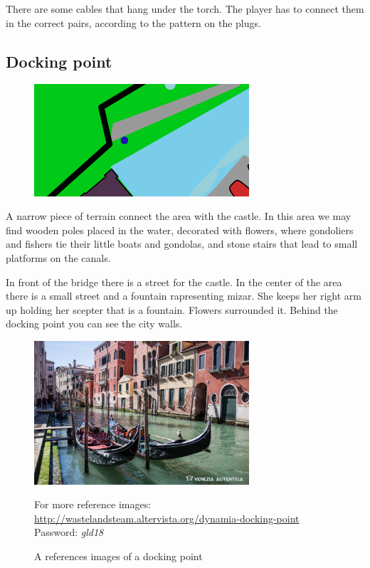 There are some cables that hang under the torch. The player has to connect them in the correct pairs, according to the pattern on the plugs.

\subsection{Docking point}
\begin{figure}[H]
    \centering
    \includegraphics[width=8cm]{Images/Maps/dockingPoint}
  \end{figure}
A narrow piece of terrain connect the area with the castle. 
In this area we may find wooden poles placed in the water, decorated with flowers, where gondoliers and fishers tie their little boats and gondolas, and  stone stairs that lead to small platforms on the canals.
 
In front of the bridge there is a street for the castle. 
In the center of the area there is a small street and a fountain rapresenting mizar. She keeps her right arm up holding her scepter that is a fountain. Flowers surrounded it. Behind the docking point you can see the city walls.
\begin{figure}[H]
    \centering
    \includegraphics[width=8cm]{Images/Landmarks/dockingPoint}
    \caption{A references images of a docking point}
    For more reference images: \href{http://wastelandsteam.altervista.org/dynamia-docking-point}{http://wastelandsteam.altervista.org/dynamia-docking-point}\\Password: \textit{gld18}
  \end{figure}
